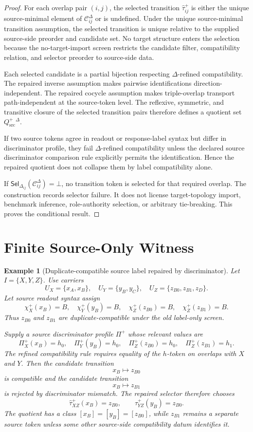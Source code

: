 \documentclass[11pt]{article}
\newcommand{\Qsrc}{Q_{\mathrm{src}}^{+}}
\newcommand{\Prof}{\Pi^{+}}
\newcommand{\Cand}{\mathcal{C}^{\Delta}}
\newcommand{\Sel}{\mathsf{Sel}_{\Delta}}
\newtheorem{example}{Example}
\begin{document}
\begin{proof}
For each overlap pair \((i,j)\), the selected transition
\(\widehat{\tau}_{ij}^+\) is either the unique source-minimal element of
\(\Cand_{ij}\) or is undefined. Under the unique source-minimal transition
assumption, the selected transition is unique relative to the supplied
source-side preorder and candidate set. No target structure enters the
selection because the no-target-import screen restricts the candidate filter,
compatibility relation, and selector preorder to source-side data.

Each selected candidate is a partial bijection respecting
\(\Delta\)-refined compatibility. The repaired inverse assumption makes
pairwise identifications direction-independent. The repaired cocycle
assumption makes triple-overlap transport path-independent at the source-token
level. The reflexive, symmetric, and transitive closure of the selected
transition pairs therefore defines a quotient set
\(\Qsrc^{\Delta}\).

If two source tokens agree in readout or response-label syntax but differ in
discriminator profile, they fail \(\Delta\)-refined compatibility unless the
declared source discriminator comparison rule explicitly permits the
identification. Hence the repaired quotient does not collapse them by label
compatibility alone.

If \(\Sel_{ij}(\Cand_{ij})=\bot\), no transition token is selected for that
required overlap. The construction records selector failure. It does not
license target-topology import, benchmark inference, role-authority
selection, or arbitrary tie-breaking. This proves the conditional result.
\end{proof}

\section{Finite Source-Only Witness}

\begin{example}[Duplicate-compatible source label repaired by discriminator]
Let \(I=\{X,Y,Z\}\). Use carriers
\[
  U_X=\{x_A,x_B\},\quad
  U_Y=\{y_B,y_C\},\quad
  U_Z=\{z_{B0},z_{B1},z_D\}.
\]
Let source readout syntax assign
\[
  \chi_X^+(x_B)=B,\quad
  \chi_Y^+(y_B)=B,\quad
  \chi_Z^+(z_{B0})=B,\quad
  \chi_Z^+(z_{B1})=B.
\]
Thus \(z_{B0}\) and \(z_{B1}\) are duplicate-compatible under the old
label-only screen.

Supply a source discriminator profile \(\Prof\) whose relevant values are
\[
  \Prof_X(x_B)=h_0,\quad
  \Prof_Y(y_B)=h_0,\quad
  \Prof_Z(z_{B0})=h_0,\quad
  \Prof_Z(z_{B1})=h_1.
\]
The refined compatibility rule requires equality of the \(h\)-token on
overlaps with \(X\) and \(Y\). Then the candidate transition
\[
  x_B\mapsto z_{B0}
\]
is compatible and the candidate transition
\[
  x_B\mapsto z_{B1}
\]
is rejected by discriminator mismatch. The repaired selector therefore
chooses
\[
  \widehat{\tau}_{XZ}^+(x_B)=z_{B0},
  \qquad
  \widehat{\tau}_{YZ}^+(y_B)=z_{B0}.
\]
The quotient has a class \([x_B]=[y_B]=[z_{B0}]\), while \(z_{B1}\) remains a
separate source token unless some other source-side compatibility datum
identifies it.
\end{example}
\end{document}
